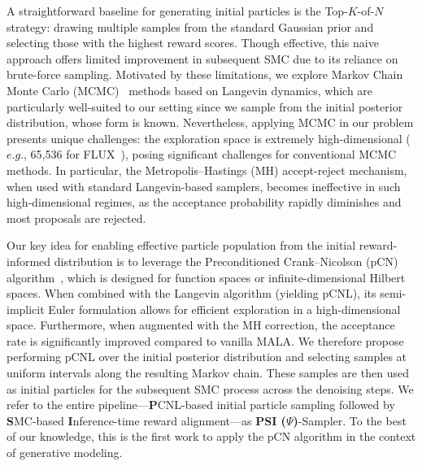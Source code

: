 A straightforward baseline for generating initial particles is the Top-$K$-of-$N$ strategy: drawing multiple samples from the standard Gaussian prior and selecting those with the highest reward scores. Though effective, this naive approach offers limited improvement in subsequent SMC due to its reliance on brute-force sampling. Motivated by these limitations, we explore Markov Chain Monte Carlo (MCMC)~\cite{metropolis_hastings, bj/1178291835, roberts2002langevin, duane1987hybrid, girolami2011riemann, Brooks_2011} methods based on Langevin dynamics, which are particularly well-suited to our setting since we sample from the initial posterior distribution, whose form is known. Nevertheless, applying MCMC in our problem presents unique challenges: the exploration space is extremely high-dimensional ($e.g.$, 65,536 for FLUX~\cite{BlackForestLabs:2024Flux}), posing significant challenges for conventional MCMC methods. In particular, the Metropolis–Hastings (MH) accept-reject mechanism, when used with standard Langevin-based samplers, becomes ineffective in such high-dimensional regimes, as the acceptance probability rapidly diminishes and most proposals are rejected.

Our key idea for enabling effective particle population from the initial reward-informed distribution is to leverage the Preconditioned Crank–Nicolson (pCN) algorithm~\cite{Cotter_2013pcnl, Beskos_2017geometricMCMC, doi:10.1142/S0219493708002378pcnlDiffusionBridge}, which is designed for function spaces or infinite-dimensional Hilbert spaces. When combined with the Langevin algorithm (yielding pCNL), its semi-implicit Euler formulation allows for efficient exploration in a high-dimensional space. Furthermore, when augmented with the MH correction, the acceptance rate is significantly improved compared to vanilla MALA. We therefore propose performing pCNL over the initial posterior distribution and selecting samples at uniform intervals along the resulting Markov chain. These samples are then used as initial particles for the subsequent SMC process across the denoising steps. We refer to the entire pipeline—\textbf{P}CNL-based initial particle sampling followed by \textbf{S}MC-based \textbf{I}nference-time reward alignment—as \textbf{PSI ($\Psi$)}-Sampler. To the best of our knowledge, this is the first work to apply the pCN algorithm in the context of generative modeling.

